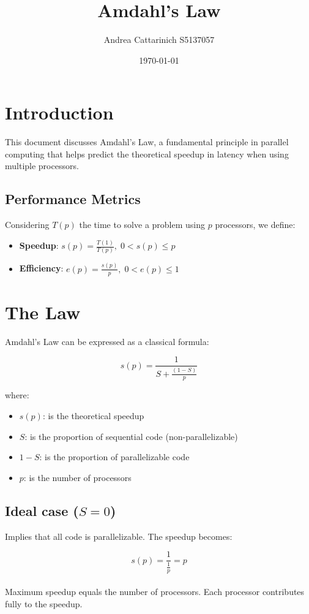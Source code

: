 \documentclass[a4paper,12pt]{article}
\title{Amdahl's Law}
\author{Andrea Cattarinich S5137057}
\date{\today}
\begin{document}
\maketitle

\section{Introduction}
This document discusses Amdahl's Law, a fundamental principle in parallel computing that helps predict the theoretical speedup in latency when using multiple processors.

\subsection{Performance Metrics}
Considering $T(p)$ the time to solve a problem using $p$ processors, we define:
\begin{itemize}
    \item \textbf{Speedup}: $s(p) = \frac{T(1)}{T(p)},\; 0 < s(p) \le p$
    \item \textbf{Efficiency}: $e(p) = \frac{s(p)}{p},\; 0 < e(p) \le 1$
\end{itemize}

\section{The Law}
Amdahl's Law can be expressed as a classical formula:

\[
s(p) = \frac{1}{S + \frac{(1-S)}{p}}
\]

where:
\begin{itemize}
    \item $s(p)$: is the theoretical speedup
    \item $S$: is the proportion of sequential code (non-parallelizable)
    \item $1-S$: is the proportion of parallelizable code
    \item $p$: is the number of processors
\end{itemize}

\subsection{Ideal case ($S=0$)}
Implies that all code is parallelizable. The speedup becomes:

\[
s(p) = \frac{1}{\frac{1}{p}} = {p}
\]
\\
Maximum speedup equals the number of processors. Each processor contributes fully to the speedup.
\end{document}
